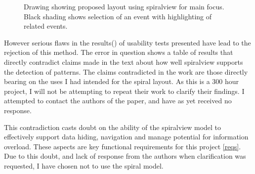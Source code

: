 \begin{figure}[tbh]
\caption{\protect\label{spiral_plan}Drawing showing proposed layout using spiralview for main focus. Black shading shows selection of an event with highlighting of related events.}
\end{figure}
 
However serious flaws in the results(\cite{chin2009visual}) of usability tests presented have lead to the rejection of this method. The error in question shows a table of results that directly contradict claims made in the text about how well spiralview supports the detection of patterns. The claims contradicted in the work are those directly bearing on the uses I had intended for the spiral layout. As this is a 300 hour project, I will not be attempting to repeat their work to clarify their findings. I attempted to contact the authors of the paper, and have as yet received no response.

This contradiction casts doubt on the ability of the spiralview model to effectively support data hiding, navigation and manage potential for information overload. These aspects are key functional requirements for this project \ref{reqs}. Due to this doubt, and lack of response from the authors when clarification was requested, I have chosen not to use the spiral model. 

